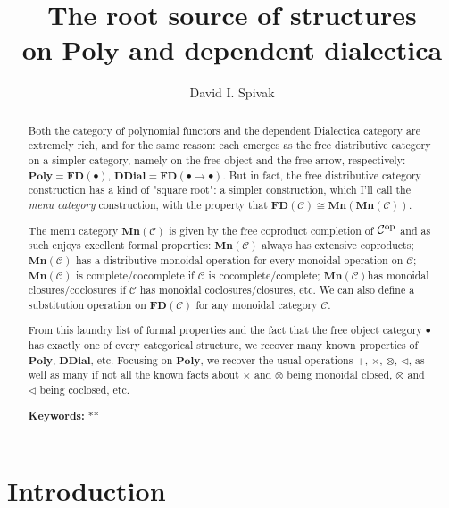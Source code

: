 \documentclass[11pt, one side, article]{memoir}
\theoremstyle{definition}
\theoremstyle{plain}
\newcommand{\cat}[1]{\mathcal{#1}}%
\newcommand{\Cat}[1]{\mathbf{#1}}%
\newcommand{\op}{^\tn{op}}
\newcommand{\tn}[1]{\textnormal{#1}}
\newcommand{\poly}{\Cat{Poly}}
\newcommand{\0}{\Cat{0}}
\newcommand{\1}{\Cat{1}}
\newcommand{\tri}{\mathbin{\triangleleft}}
\newcommand{\fd}{\Cat{FD}}
\newcommand{\mn}{\Cat{Mn}}
\newcommand{\ddial}{\Cat{DDial}}
\begin{document}
\title{The root source of structures\\on $\poly$ and dependent dialectica
}

\author{David I. Spivak}

\date{\vspace{-.2in}}

\maketitle

\begin{abstract}
Both the category of polynomial functors and the dependent Dialectica category are extremely rich, and for the same reason: each emerges as the free distributive category on a simpler category, namely on the free object and the free arrow, respectively: $\poly=\fd(\bullet)$, $\ddial=\fd(\bullet\to\bullet)$. But in fact, the free distributive category construction has a kind of "square root": a simpler construction, which I'll call the \emph{menu category} construction, with the property that $\fd(\cat{C})\cong\mn(\mn(\cat{C}))$.

The menu category $\mn(\cat{C})$ is given by the free coproduct completion of $\cat{C}\op$ and as such enjoys excellent formal properties: $\mn(\cat{C})$ always has extensive coproducts; $\mn(\cat{C})$ has a distributive monoidal operation for every monoidal operation on $\cat{C}$; $\mn(\cat{C})$ is complete/cocomplete if $\cat{C}$ is cocomplete/complete; $\mn(\cat{C})$has monoidal closures/coclosures if $\cat{C}$ has monoidal coclosures/closures, etc. We can also define a substitution operation on $\fd(\cat{C})$ for any monoidal category $\cat{C}$. 

From this laundry list of formal properties and the fact that the free object category $\bullet$ has exactly one of every categorical structure, we recover many known properties of $\poly$, $\Cat{DDial}$, etc. Focusing on $\poly$, we recover the usual operations $+$, $\times$, $\otimes$, $\tri$, as well as many if not all the known facts about $\times$ and $\otimes$ being monoidal closed, $\otimes$ and $\tri$ being coclosed, etc.  \\

\smallskip

\noindent
\textbf{Keywords:} **
\end{abstract}

\chapter{Introduction}
\end{document}
